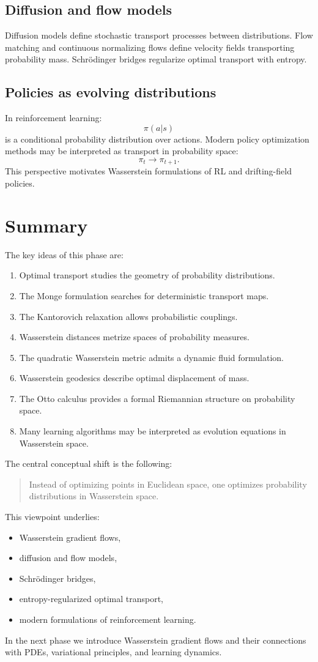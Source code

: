 \subsection{Diffusion and flow models}
Diffusion models define stochastic transport processes between distributions.
Flow matching and continuous normalizing flows define velocity fields transporting probability mass.
Schr\"odinger bridges regularize optimal transport with entropy.
\subsection{Policies as evolving distributions}
In reinforcement learning:
\[
\pi(a|s)
\]
is a conditional probability distribution over actions.
Modern policy optimization methods may be interpreted as transport in probability space:
\[
\pi_t
\rightarrow
\pi_{t+1}.
\]
This perspective motivates Wasserstein formulations of RL and drifting-field policies.
\section{Summary}
The key ideas of this phase are:
\begin{enumerate}[label=(\arabic*)]
    \item Optimal transport studies the geometry of probability distributions.
    \item The Monge formulation searches for deterministic transport maps.
    \item The Kantorovich relaxation allows probabilistic couplings.
    \item Wasserstein distances metrize spaces of probability measures.
    \item The quadratic Wasserstein metric admits a dynamic fluid formulation.
    \item Wasserstein geodesics describe optimal displacement of mass.
    \item The Otto calculus provides a formal Riemannian structure on probability space.
    \item Many learning algorithms may be interpreted as evolution equations in Wasserstein space.
\end{enumerate}
The central conceptual shift is the following:
\begin{quote}
Instead of optimizing points in Euclidean space, one optimizes probability distributions in Wasserstein space.
\end{quote}
This viewpoint underlies:
\begin{itemize}
    \item Wasserstein gradient flows,
    \item diffusion and flow models,
    \item Schr\"odinger bridges,
    \item entropy-regularized optimal transport,
    \item modern formulations of reinforcement learning.
\end{itemize}
In the next phase we introduce Wasserstein gradient flows and their connections with PDEs, variational principles, and learning dynamics.
